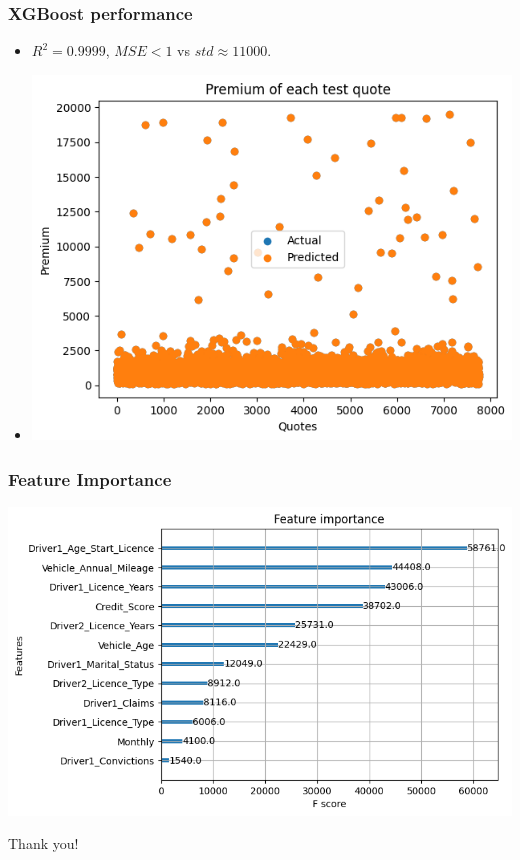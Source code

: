 \documentclass{beamer}
\theoremstyle{definition}
\begin{document}
\begin{frame}
\frametitle{XGBoost performance}
\begin{itemize}
\item<1-> $R^2=0.9999$, $MSE<1$ vs $std\approx 11000$.
\item[]
\begin{center}
\includegraphics[scale=0.5]{twodrivers} %
\end{center}
\end{itemize}
\end{frame}
\begin{frame}
\frametitle{Feature Importance}
\begin{center}
\includegraphics[scale=0.5]{twoimportance}
\end{center}
\end{frame}

\begin{frame}
\begin{center}
\Huge{Thank you!}
\end{center}
\end{frame}
\end{document}

